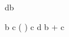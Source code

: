 \begin{eqcode}{d}{b}{}{}
   \lend
\end{eqcode}

\begin{eqcode}{\mu}{ }{ }{}
  b \in {} \lend
  c \in ( \rightarrow {}) \lend
  c \gets d \lend
  b \gets {} + c \lend %
\end{eqcode}
